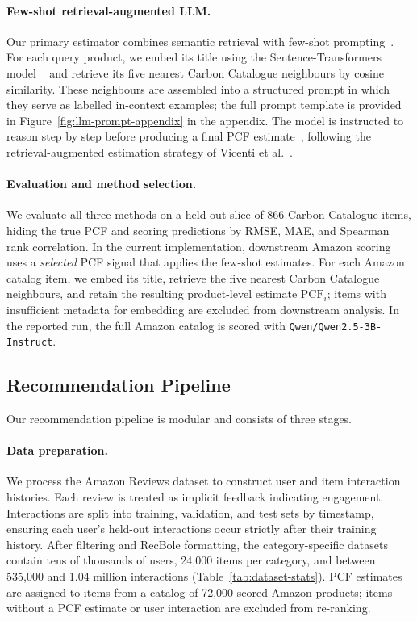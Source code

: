 \documentclass[11pt]{article}
\begin{document}
\paragraph{Few-shot retrieval-augmented LLM.}
Our primary estimator combines semantic retrieval with few-shot
prompting~\cite{brown2020gpt3}. For each query product, we embed its title using the
Sentence-Transformers model \texttt{}~\cite{reimers2019sbert} and retrieve its five nearest Carbon
Catalogue neighbours by cosine similarity. These neighbours are assembled into a structured
prompt in which they serve as labelled in-context examples; the full prompt template is provided in
Figure~\ref{fig:llm-prompt-appendix} in the appendix. The model is instructed to reason step by step before
producing a final PCF estimate~\cite{wei2022cot}, following the retrieval-augmented
estimation strategy of Vicenti et al.~\cite{vicenti2026pcfllm}.

\paragraph{Evaluation and method selection.}
We evaluate all three methods on a held-out slice of 866 Carbon Catalogue items, hiding the
true PCF and scoring predictions by RMSE, MAE, and Spearman rank correlation. In the
current implementation, downstream Amazon scoring uses a \emph{selected} PCF signal that
applies the few-shot estimates. For each Amazon catalog item, we embed its title, retrieve the
five nearest Carbon Catalogue neighbours, and retain the resulting product-level estimate
$\mathrm{PCF}_i$; items with insufficient metadata for embedding are excluded from
downstream analysis. In the reported run, the full Amazon catalog is scored with
\texttt{Qwen/Qwen2.5-3B-Instruct}.



\subsection{Recommendation Pipeline}

Our recommendation pipeline is modular and consists of three stages.

\paragraph{Data preparation.}
We process the Amazon Reviews dataset to construct user and item interaction histories. Each
review is treated as implicit feedback indicating engagement. Interactions are split into
training, validation, and test sets by timestamp, ensuring each user's held-out
interactions occur strictly after their training history. After filtering and RecBole formatting, the category-specific datasets contain tens of
thousands of users, 24{,}000 items per category, and between 535{,}000 and
1.04 million interactions (Table~\ref{tab:dataset-stats}). PCF estimates are
assigned to items from a catalog of 72{,}000 scored Amazon products; items without a PCF
estimate or user interaction are excluded from re-ranking.
\end{document}
